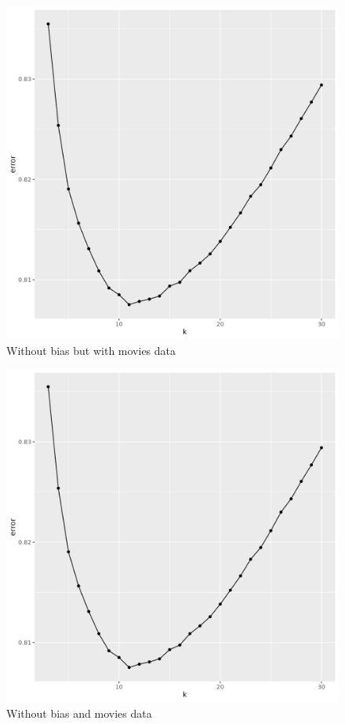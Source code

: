 \documentclass[
]{article}
\begin{document}
\begin{figure}
\centering
\includegraphics{./model-no-bias-with-movies.png}
\caption{Without bias but with movies data}
\end{figure}

\begin{figure}
\centering
\includegraphics{./model-no-bias-no-movies.png}
\caption{Without bias and movies data}
\end{figure}
\end{document}
